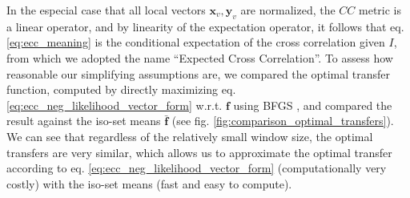 In the especial case that all local vectors $\mathbf{x}_{v}, \mathbf{y}_{v}$ are normalized, the $CC$ metric is a linear operator, and by linearity of the expectation operator, it follows that eq. \eqref{eq:ecc_meaning} is the conditional expectation of the cross correlation given $I$, from which we adopted the name ``Expected Cross Correlation''. To assess how reasonable our simplifying assumptions are, we compared the optimal transfer function, computed by directly maximizing eq. \eqref{eq:ecc_neg_likelihood_vector_form} w.r.t. $\mathbf{f}$ using BFGS \citep{GVK502988711}, and compared the result against the iso-set means $\mathbf{\bar{f}}$ (see fig. \ref{fig:comparison_optimal_transfers}). We can see that regardless of the relatively small window size, the optimal transfers are very similar, which allows us to approximate the optimal transfer according to eq. \eqref{eq:ecc_neg_likelihood_vector_form} (computationally very costly) with the iso-set means (fast and easy to compute).\\


